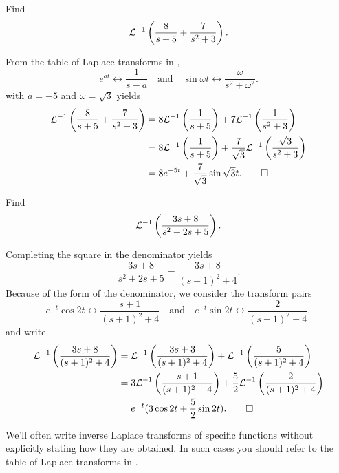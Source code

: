 \begin{example}\label{example:8.2.2}
Find
\[
{\mathcal L}^{-1}\left(\frac{8}{s+5}+\frac{7}{s^2+3}\right).
\]
\end{example}

\begin{solution}
From the table of Laplace transforms in ,
\[
e^{at}\leftrightarrow \frac{1}{s-a}\quad\text{and}\quad
\sin\omega t\leftrightarrow \frac{\omega}{s^2+\omega^2}.
\]
with $a=-5$ and   $\omega=\sqrt3$
yields
\begin{align*}
{\mathcal L}^{-1}\left(\frac{8}{s+5}+\frac{7}{s^2+3}\right)
&=8{\mathcal L}^{-1}\left(\frac{1}{s+5}\right)
+7{\mathcal L}^{-1}\left(\frac{1}{s^2+3}\right)\\
&=8{\mathcal L}^{-1}\left(\frac{1}{s+5}\right)
+\frac{7}{\sqrt3}{\mathcal L}^{-1}\left(\frac{\sqrt3}{s^2+3}\right)\\
&=8e^{-5t}+\frac{7}{\sqrt3}\sin\sqrt3t.\qedhere
\end{align*}
\end{solution}

\begin{example}\label{example:8.2.3}
Find
\[
{\mathcal L}^{-1}\left(\frac{3s+8}{s^2+2s+5}\right).
\]
\end{example}

\begin{solution}
Completing the square in the denominator yields
\[
\frac{3s+8}{s^2+2s+5}=\frac{3s+8}{(s+1)^2+4}.
\]
Because of the form of the denominator, we consider
the transform pairs
\[
 e^{-t}\cos 2t\leftrightarrow\frac{s+1}{(s+1)^2+4}
\quad\text{and}\quad 
 e^{-t}\sin 2t\leftrightarrow\frac{2}{(s+1)^2+4},
\]
and write
\begin{align*}
{\mathcal L}^{-1}\left(\frac{3s+8}{(s+1)^2+4}\right)
&={\mathcal L}^{-1}\left(\frac{3s+3}{(s+1)^2+4}\right)
+{\mathcal L}^{-1}\left(\frac{5}{(s+1)^2+4}\right)\\
&=3{\mathcal L}^{-1}\left(\frac{s+1}{(s+1)^2+4}\right)
+\frac{5}{2}{\mathcal L}^{-1}\left(\frac{2}{(s+1)^2+4}\right)\\
&=e^{-t}(3\cos 2t+\frac{5}{2}\sin 2t).\qedhere
\end{align*}
\end{solution}

\begin{remark*}
We'll often write inverse Laplace transforms of specific
functions without explicitly stating how they are obtained. In such
cases you should refer to the table of Laplace transforms in .
\end{remark*}


